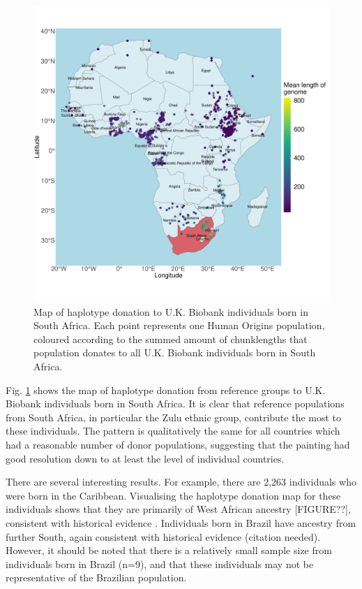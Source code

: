 \begin{figure}[htp]
    \centering
    \includegraphics[width=1.0\textwidth]{../images/chapter3/haplotype_map_SouthAfrica.pdf}
    \caption{Map of haplotype donation to U.K. Biobank individuals born in South Africa. Each point represents one Human Origins population, coloured according to the summed amount of chunklengths that population donates to all U.K. Biobank individuals born in South Africa. }
    \label{fig:haplotype_map_SouthAfrica}
\end{figure}

Fig. \ref{fig:haplotype_map_SouthAfrica} shows the map of haplotype donation from reference groups to U.K. Biobank individuals born in South Africa. It is clear that reference populations from South Africa, in particular the Zulu ethnic group, contribute the most to these individuals. The pattern is qualitatively the same for all countries which had a reasonable number of donor populations, suggesting that the painting had good resolution down to at least the level of individual countries.

There are several interesting results. For example, there are 2,263 individuals who were born in the Caribbean. Visualising the haplotype donation map for these individuals shows that they are primarily of West African ancestry {\color{red}[FIGURE??]}, consistent with historical evidence \cite{micheletti2020genetic}. Individuals born in Brazil have ancestry from further South, again consistent with historical evidence (citation needed). However, it should be noted that there is a relatively small sample size from individuals born in Brazil (n=9), and that these individuals may not be representative of the Brazilian population. 

